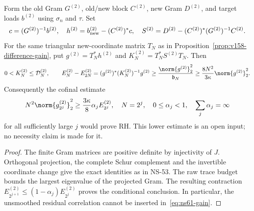 \begin{proposition}
\label{prop:ns61-gain}
Form the old Gram $G^{(2)}$, old/new block $C^{(2)}$, new Gram
$D^{(2)}$, and target loads $b^{(2)}$ using $\sigma_n$ and $\tau$.
Set
\[
 c=(G^{(2)})^{-1}b^{(2)},\quad
 h^{(2)}=b_{\rm new}^{(2)}-(C^{(2)})^*c,\quad
 S^{(2)}=D^{(2)}-(C^{(2)})^*(G^{(2)})^{-1}C^{(2)}.
\]
For the same triangular new-coordinate matrix $T_N$ as in
Proposition~\ref{prop:v158-difference-gain}, put
$g^{(2)}=T_N^*h^{(2)}$ and $K_N^{(2)}=T_N^*S^{(2)}T_N$.
Then
\begin{equation}
 0<K_N^{(2)}\leq\mathcal D_N^{(2)},\qquad
 E_N^{(2)}-E_{2N}^{(2)}
 =(g^{(2)})^*(K_N^{(2)})^{-1}g^{(2)}
 \geq\frac{\norm{g^{(2)}}_2^2}{\mathfrak b_N}
 \geq\frac{8N^2}{3\kappa}\norm{g^{(2)}}_2^2.
 \label{eq:ns61-gain}
\end{equation}
Consequently the cofinal estimate
\begin{equation}
 N^2\norm{g_{2^j}^{(2)}}_2^2
 \geq\frac{3\kappa}{8}\alpha_j E_{2^j}^{(2)},
 \quad N=2^j,\quad 0\leq\alpha_j<1,\quad
 \sum_j\alpha_j=\infty
 \label{eq:ns61-open-correlation}
\end{equation}
for all sufficiently large $j$ would prove RH. This lower estimate
is an open input; no necessity claim is made for it.
\end{proposition}
\begin{proof}
The finite Gram matrices are positive definite by injectivity of $J$.
Orthogonal projection, the complete Schur complement and the invertible
coordinate change give the exact identities as in NS-53.
The raw trace budget bounds the largest eigenvalue of the projected
Gram. The resulting contraction
$E_{2^{j+1}}^{(2)}\leq(1-\alpha_j)E_{2^j}^{(2)}$ proves the
conditional conclusion. In particular, the unsmoothed residual
correlation cannot be inserted in~\eqref{eq:ns61-gain}.
\end{proof}

